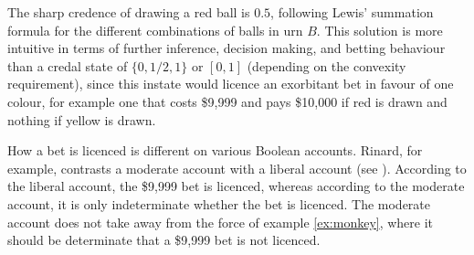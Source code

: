 \documentclass[11pt]{article}
\begin{document}
The sharp credence of drawing a red ball is $0.5$, following Lewis'
summation formula for the different combinations of balls in urn $B$.
This solution is more intuitive in terms of further inference,
decision making, and betting behaviour than a credal state of
$\{0,1/2,1\}$ or $[0,1]$ (depending on the convexity requirement),
since this instate would licence an exorbitant bet in favour of one
colour, for example one that costs \$9,999 and pays \$10,000 if red is
drawn and nothing if yellow is drawn. 

How a bet is licenced is different on various Boolean accounts.
Rinard, for example, contrasts a moderate account with a liberal
account (see ). According to the liberal
account, the \$9,999 bet is licenced, whereas according to the
moderate account, it is only indeterminate whether the bet is
licenced. The moderate account does not take away from the force of
example \ref{ex:monkey}, where it should be determinate that a \$9,999
bet is not licenced.

 

\end{document}
